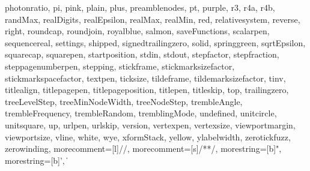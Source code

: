 {{  photonratio, pi, pink, plain, plus, preamblenodes, pt, purple, r3, r4a,
  r4b, randMax, realDigits, realEpsilon, realMax, realMin, red,
  relativesystem, reverse, right, roundcap, roundjoin, royalblue, salmon,
  saveFunctions, scalarpen, sequencereal, settings, shipped,
  signedtrailingzero, solid, springgreen, sqrtEpsilon, squarecap, squarepen,
  startposition, stdin, stdout, stepfactor, stepfraction, steppagenumberpen,
  stepping, stickframe, stickmarksizefactor, stickmarkspacefactor, textpen,
  ticksize, tildeframe, tildemarksizefactor, tinv, titlealign, titlepagepen,
  titlepageposition, titlepen, titleskip, top, trailingzero, treeLevelStep,
  treeMinNodeWidth, treeNodeStep, trembleAngle, trembleFrequency,
  trembleRandom, tremblingMode, undefined, unitcircle, unitsquare, up,
  urlpen, urlskip, version, vertexpen, vertexsize, viewportmargin,
  viewportsize, vline, white, wye, xformStack, yellow, ylabelwidth,
  zerotickfuzz, zerowinding},
  morecomment=[l]{//},%
  morecomment=[s]{/*}{*/},%
  morestring=[b]",%
  morestring=[b]',%
}
%
%
\def\oldvert{|} %
\lstMakeShortInline[style=lesscolor]\|

\def\inlinecode{\expandafter\lstinline[style=lesscolor]}

\endinput

